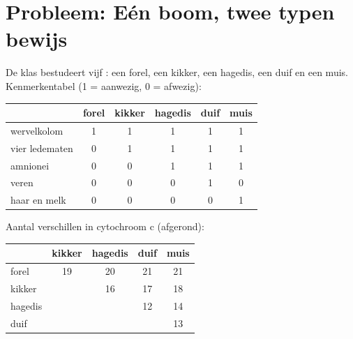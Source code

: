 \section{Probleem: Eén boom, twee typen bewijs}

\begin{problem}
\label{pb:g10:common-ancestry:1}
De klas bestudeert vijf : een forel, een kikker, een hagedis, een
duif en een muis. Kenmerkentabel (1 = aanwezig, 0 = afwezig):

\begin{center}
\begin{tabular}{lccccc}
 & forel & kikker & hagedis & duif & muis \\ \hline
wervelkolom & 1 & 1 & 1 & 1 & 1 \\
vier ledematen & 0 & 1 & 1 & 1 & 1 \\
amnionei & 0 & 0 & 1 & 1 & 1 \\
veren & 0 & 0 & 0 & 1 & 0 \\
haar en melk & 0 & 0 & 0 & 0 & 1 \\
\end{tabular}
\end{center}

Aantal verschillen in cytochroom c (afgerond):

\begin{center}
\begin{tabular}{lcccc}
 & kikker & hagedis & duif & muis \\ \hline
forel & 19 & 20 & 21 & 21 \\
kikker & & 16 & 17 & 18 \\
hagedis & & & 12 & 14 \\
duif & & & & 13 \\
\end{tabular}
\end{center}


\end{problem}
